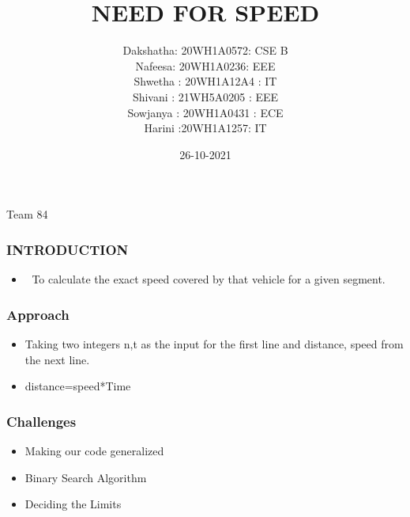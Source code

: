 \documentclass[14pt]{beamer}
\title{NEED FOR SPEED}
\date{26-10-2021}
\author[Bvrith]{Dakshatha: 20WH1A0572: CSE B \\ Nafeesa: 20WH1A0236: EEE \\ Shwetha : 20WH1A12A4 : IT \\ Shivani : 21WH5A0205 : EEE \\ Sowjanya : 20WH1A0431 : ECE \\ Harini :20WH1A1257:  IT}
\begin{document}
    \begin{frame}
    \begin{center}
          \titlepage
        \small{Team 84}
        \end{center}
    \end{frame}
    \begin{frame}
	\frametitle{INTRODUCTION}
        \begin{itemize}
	    \item	To calculate the exact speed covered by that vehicle for a given segment.
	\end{itemize}
    \end{frame}
    \begin{frame}
	\frametitle{Approach}
	\begin{itemize}
             \item Taking two integers n,t as the input for the first line and distance, speed from the next line.
             \item distance=speed*Time
	\end{itemize}
    \end{frame}
    \begin{frame}
	\frametitle{Challenges}
        \begin{itemize}
	    \item Making our code generalized
             \item Binary Search Algorithm
             \item Deciding the Limits
        \end{itemize}
    \end{frame}
\end{document}
